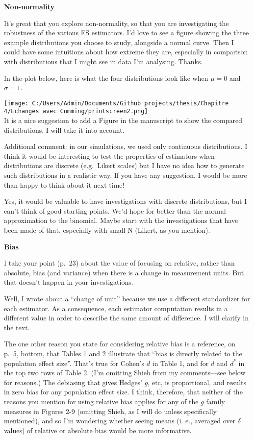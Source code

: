 \documentclass[
  12pt,
  french,
]{article}
\begin{document}
\color{black} \textbf{Non-normality}

It's great that you explore non-normality, so that you are investigating
the robustness of the various ES estimators. I'd love to see a figure
showing the three example distributions you choose to study, alongside a
normal curve. Then I could have some intuitions about how extreme they
are, especially in comparison with distributions that I might see in
data I'm analysing. Thanks.

\color{blue} In the plot below, here is what the four distributions look
like when \(\mu = 0\) and \(\sigma = 1\).

\texttt{[image: C:/Users/Admin/Documents/Github projects/thesis/Chapitre 4/Echanges avec Cumming/printscreen2.png]}\\
It is a nice suggestion to add a Figure in the manuscript to show the
compared distributions, I will take it into account.

Additional comment: in our simulations, we used only continuous
distributions. I think it would be interesting to test the properties of
estimators when distributions are discrete (e.g.~Likert scales) but I
have no idea how to generate such distributions in a realistic way. If
you have any suggestion, I would be more than happy to think about it
next time!

\color{brown} Yes, it would be valuable to have investigations with
discrete distributions, but I can't think of good starting points. We'd
hope for better than the normal approximation to the binomial. Maybe
start with the investigations that have been made of that, especially
with small N (Likert, as you mention).

\color{black}\textbf{Bias}

I take your point (p.~23) about the value of focusing on relative,
rather than absolute, bias (and variance) when there is a change in
measurement units. But that doesn't happen in your investigations.

\color{blue} Well, I wrote about a ``change of unit'' because we use a
different standardizer for each estimator. As a consequence, each
estimator computation results in a different value in order to describe
the same amount of difference. I will clarify in the text.

\color{black} The one other reason you state for considering relative
bias is a reference, on p.~5, bottom, that Tables 1 and 2 illustrate
that ``bias is directly related to the population effect size''. That's
true for Cohen's \(d\) in Table 1, and for \(d\) and \(d^*\) in the top
two rows of Table 2. (I'm omitting Shieh from my comments---see below
for reasons.) The debiasing that gives Hedges' \(g\), etc, is
proportional, and results in zero bias for any population effect size. I
think, therefore, that neither of the reasons you mention for using
relative bias applies for any of the \(g\) family measures in Figures
2-9 (omitting Shieh, as I will do unless specifically mentioned), and so
I'm wondering whether seeing means (i. e., averaged over \(\delta\)
values) of relative or absolute bias would be more informative.
\end{document}
